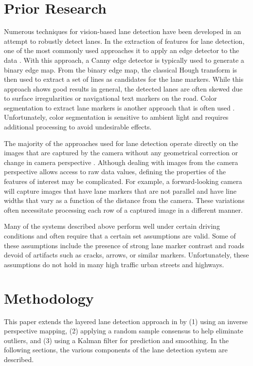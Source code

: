 \documentclass{article}
\begin{document}
\section{Prior Research}
\label{sec:prior}
Numerous techniques for vision-based lane detection have been developed in an attempt to robustly detect lanes.
In the extraction of features for lane detection, one of the most commonly used approaches it to apply an edge detector to the data \cite{assidiq_real_2008,wang_driver_2005}. With this approach, a Canny edge detector is typically used to generate a binary edge map. From the binary edge map, the classical Hough transform is then used to extract a set of lines as candidates for the lane markers.  While this approach shows good results in general, the detected lanes are often skewed due to surface irregularities or navigational text markers on the road. Color segmentation to extract lane markers is another approach that is often used \cite{sun_hsi_2006,chin_lane_2005}. Unfortunately, color segmentation is sensitive to ambient light and requires additional processing to avoid undesirable effects.

The majority of the approaches used for lane detection operate directly on the images that are captured by the camera without any geometrical correction or change in camera perspective \cite{borkar_layered_2009,assidiq_real_2008,sun_hsi_2006,wang_real-time_2006}.
Although dealing with images from the camera perspective allows access to raw data values, defining the properties of the features of interest may be complicated. For example, a forward-looking camera will capture images that have lane markers that are not parallel and have line widths that vary as a function of the distance from the camera.  These variations often necessitate processing each row of a captured image in a different manner.

Many of the systems described above perform well under certain driving conditions and often require that a certain set assumptions are valid.  Some of these assumptions include the  presence of strong lane marker contrast and roads devoid of artifacts such as cracks, arrows, or similar markers. Unfortunately, these assumptions do not hold in many high traffic urban streets and highways.

\section{Methodology}
\label{sec:methodology}
This paper extends the layered lane detection approach in \cite{borkar_layered_2009} by (1) using an inverse perspective mapping, (2) applying a random sample consensus to help eliminate outliers, and (3) using a Kalman filter for prediction and smoothing.
In the following sections, the various components of the lane detection system are described.
\end{document}
